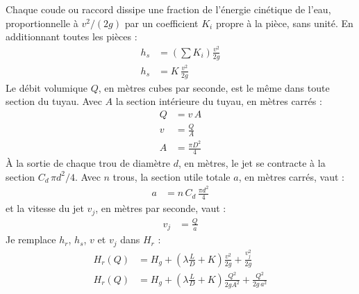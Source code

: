 \begin{demonstration}
Chaque coude ou raccord dissipe une fraction de l'énergie cinétique de l'eau, proportionnelle à $v^2/(2g)$ par un coefficient $K_i$ propre à la pièce, sans unité. En additionnant toutes les pièces :
\begin{align*}
h_s &= \left(\sum K_i\right)\frac{v^2}{2g}\\
h_s &= K\,\frac{v^2}{2g}
\end{align*}
Le débit volumique $Q$, en mètres cubes par seconde, est le même dans toute section du tuyau. Avec $A$ la section intérieure du tuyau, en mètres carrés :
\begin{align*}
Q &= v\,A\\
v &= \frac{Q}{A}\\
A &= \frac{\pi D^2}{4}
\end{align*}
À la sortie de chaque trou de diamètre $d$, en mètres, le jet se contracte à la section $C_d\,\pi d^2/4$. Avec $n$ trous, la section utile totale $a$, en mètres carrés, vaut :
\begin{align*}
a &= n\,C_d\,\frac{\pi d^2}{4}
\end{align*}
et la vitesse du jet $v_j$, en mètres par seconde, vaut :
\begin{align*}
v_j &= \frac{Q}{a}
\end{align*}
Je remplace $h_r$, $h_s$, $v$ et $v_j$ dans $H_r$ :
\begin{align*}
H_r(Q) &= H_g + \left(\lambda\frac{L}{D} + K\right)\frac{v^2}{2g} + \frac{v_j^2}{2g}\\
H_r(Q) &= H_g + \left(\lambda\frac{L}{D} + K\right)\frac{Q^2}{2gA^2} + \frac{Q^2}{2g\,a^2}
\end{align*}
\end{demonstration}

